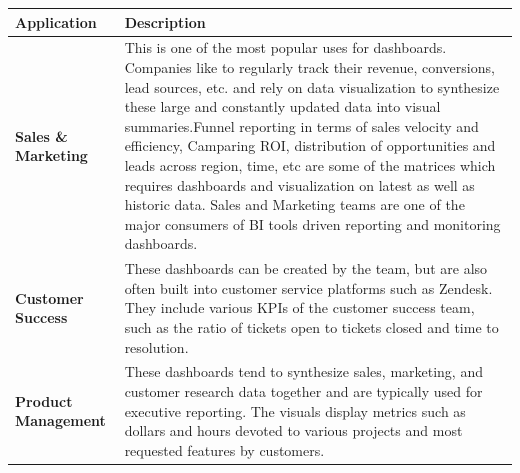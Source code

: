 \documentclass[]{book}
\begin{document}
\begin{longtable}[]{@{}ll@{}}
\toprule
\begin{minipage}[b]{0.15\columnwidth}\raggedright
\textbf{Application}\strut
\end{minipage} & \begin{minipage}[b]{0.79\columnwidth}\raggedright
\textbf{Description}\strut
\end{minipage}\tabularnewline
\midrule
\endhead
\begin{minipage}[t]{0.15\columnwidth}\raggedright
\textbf{Sales \& Marketing}\strut
\end{minipage} & \begin{minipage}[t]{0.79\columnwidth}\raggedright
This is one of the most popular uses for dashboards. Companies like to regularly track their revenue, conversions, lead sources, etc. and rely on data visualization to synthesize these large and constantly updated data into visual summaries.Funnel reporting in terms of sales velocity and efficiency, Camparing ROI, distribution of opportunities and leads across region, time, etc are some of the matrices which requires dashboards and visualization on latest as well as historic data. Sales and Marketing teams are one of the major consumers of BI tools driven reporting and monitoring dashboards.\strut
\end{minipage}\tabularnewline
\begin{minipage}[t]{0.15\columnwidth}\raggedright
\textbf{Customer Success}\strut
\end{minipage} & \begin{minipage}[t]{0.79\columnwidth}\raggedright
These dashboards can be created by the team, but are also often built into customer service platforms such as Zendesk. They include various KPIs of the customer success team, such as the ratio of tickets open to tickets closed and time to resolution.\strut
\end{minipage}\tabularnewline
\begin{minipage}[t]{0.15\columnwidth}\raggedright
\textbf{Product Management}\strut
\end{minipage} & \begin{minipage}[t]{0.79\columnwidth}\raggedright
These dashboards tend to synthesize sales, marketing, and customer research data together and are typically used for executive reporting. The visuals display metrics such as dollars and hours devoted to various projects and most requested features by customers.\strut
\end{minipage}\tabularnewline

\end{longtable}
\end{document}

